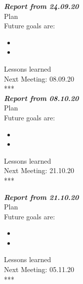 \documentclass{scrartcl}
\begin{document}
\textbf{\textit{Report from 24.09.20  }}\\
Plan\\
Future goals are: 
\begin{itemize}


	\item 
	\item 
\end{itemize}	
Lessons learned\\

Next Meeting: 08.09.20\\
\**** \\
\textbf{\textit{Report from 08.10.20  }}\\
Plan\\
Future goals are: 
\begin{itemize}


	\item 
	\item 
\end{itemize}	
Lessons learned\\

Next Meeting: 21.10.20\\


\****

\textbf{\textit{Report from 21.10.20  }}\\
Plan\\
Future goals are: 
\begin{itemize}


	\item 
	\item 
\end{itemize}	
Lessons learned\\

Next Meeting: 05.11.20\\


\****
\end{document}
